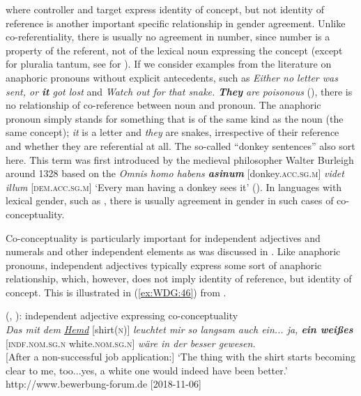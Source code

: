 \documentclass[output=collectionpaper]{langsci/langscibook}
\begin{document}
 \textendash{} where controller and target express identity of concept, but not identity of reference \textendash{} is another important specific relationship in gender agreement. Unlike co-referentiality, there is usually no agreement in number, since number is a property of the referent, not of the lexical noun expressing the concept (except for pluralia tantum, see \citealt{Waelchli2017} for ). If we consider examples from the literature on anaphoric pronouns without explicit antecedents, such as \textit{Either no letter was sent, or \textbf{it} got lost} and \textit{Watch out for that snake. \textbf{They} are poisonous} (\citealt[211]{Bosch1988}), there is no relationship of co-reference between noun and pronoun. The anaphoric pronoun simply stands for something that is of the same kind as the noun (the same concept); \textit{it} is a letter and \textit{they} are snakes, irrespective of their reference and whether they are referential at all. The so-called ``donkey sentences'' also sort here. This term was first introduced by the medieval philosopher Walter Burleigh around 1328 based on the  \textit{Omnis homo habens \textbf{asinum}} [donkey.\textsc{acc.sg.m}] \textit{videt illum} [\textsc{dem.acc.sg.m}] `Every man having a donkey sees it' (\citealt[269]{Seuren2009}). In languages with lexical gender, such as , there is usually agreement in gender in such cases of co-conceptuality.

Co-conceptuality is particularly important for independent adjectives and numerals and other independent elements as was discussed in . Like anaphoric pronouns, independent adjectives typically express some sort of anaphoric relationship, which, however, does not imply identity of reference, but identity of concept. This is illustrated in (\ref{ex:WDG:46}) from .

\ea\label{ex:WDG:46}
 (, ): independent adjective expressing co-conceptuality\\
\textit{Das mit dem \uline{Hemd}} [shirt(\textsc{n})] \textit{leuchtet mir so langsam auch ein... ja, \textbf{ein weißes}} [\textsc{indf.nom.sg.n} white.\textsc{nom.sg.n}] \textit{wäre in der  besser gewesen.}\\
{[}After a non-successful job application:{]} `The thing with the shirt starts becoming clear to me, too...yes, a white one would indeed have been better.'\\
http://www.bewerbung-forum.de [2018-11-06] \\
\z
\end{document}
